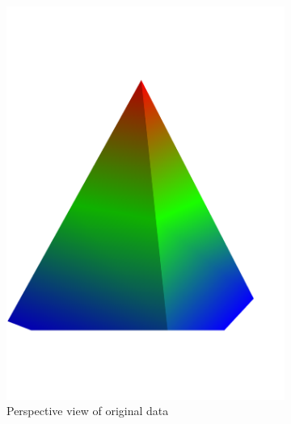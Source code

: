 \begin{figure}
\begin{subfigure}[b]{0.3\linewidth}
    \includegraphics[width=\textwidth]{figs/pyramid_o_pers}
    \caption{Perspective view of original data}
  \end{subfigure}  
  \quad
  \begin{subfigure}[b]{0.3\linewidth}
    \centering

\end{subfigure}
\end{figure}
